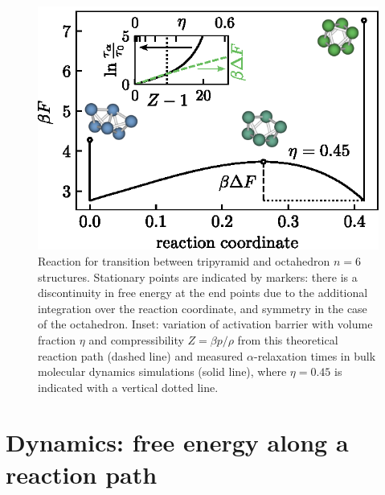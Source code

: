 \documentclass[11pt,twoside]{report}
\begin{document}
\begin{figure}
  \includegraphics[width=0.9\linewidth,outer]{n6-reaction-path}
  \caption{
    Reaction for transition between tripyramid and octahedron $n = 6$ structures.
    Stationary points are indicated by markers: there is a discontinuity in free energy at the end points due to the additional integration over the reaction coordinate, and symmetry in the case of the octahedron.
    Inset: variation of activation barrier with volume fraction $\eta$ and compressibility $Z = \beta p/\rho$ from this theoretical reaction path (dashed line) and measured $\alpha$-relaxation times in bulk molecular dynamics simulations (solid line), where $\eta = 0.45$ is indicated with a vertical dotted line.
  }
  \label{fig:reaction-path-6}
\end{figure}


\section{Dynamics: free energy along a reaction path}
\end{document}
